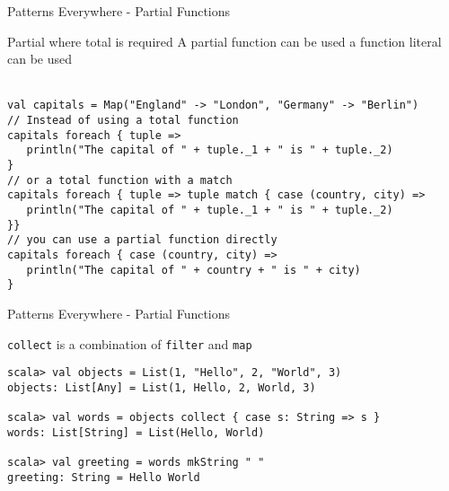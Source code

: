 \begin{frame}[fragile]{Patterns Everywhere - Partial Functions}
\begin{block}{Partial where total is required}
A partial function can be used  a function literal can be
used
\end{block}
\lstinline!!\\
\lstinline!val capitals = Map("England" -> "London", "Germany" -> "Berlin")!\\
\lstinline!// Instead of using a total function!\\
\lstinline!capitals foreach { tuple => !\\
\lstinline!   println("The capital of " + tuple._1 + " is " + tuple._2)!\\
\lstinline!}!\\
\lstinline!// or a total function with a match!\\
\lstinline!capitals foreach { tuple => tuple match { case (country, city) =>!\\
\lstinline!   println("The capital of " + tuple._1 + " is " + tuple._2)!\\
\lstinline!}}!\\
\lstinline!// you can use a partial function directly!\\
\lstinline!capitals foreach { case (country, city) =>!\\
\lstinline!   println("The capital of " + country + " is " + city)!\\
\lstinline!}!
\end{frame}

\begin{frame}[fragile]{Patterns Everywhere - Partial Functions}
\begin{exampleblock}{\lstinline!collect! is a combination of \lstinline!filter! and \lstinline!map!}
\begin{lstlisting}
scala> val objects = List(1, "Hello", 2, "World", 3)
objects: List[Any] = List(1, Hello, 2, World, 3)

scala> val words = objects collect { case s: String => s }
words: List[String] = List(Hello, World)

scala> val greeting = words mkString " "
greeting: String = Hello World
\end{lstlisting}
\end{exampleblock}
\end{frame}


